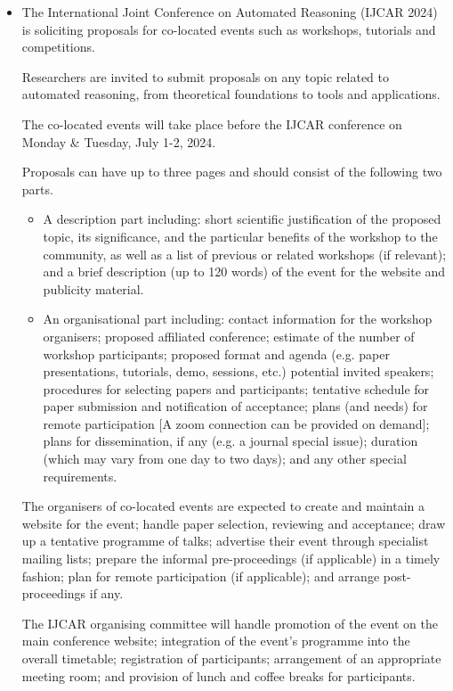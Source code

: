 \documentclass[prodmode,acmtecs]{acmsmall} %
\begin{document}
\begin{itemize}\item  The International Joint Conference on Automated Reasoning (IJCAR 2024) is soliciting proposals for co-located events such as workshops, tutorials and competitions. 
 
  Researchers are invited to submit proposals on any topic related to automated reasoning, from theoretical foundations to tools and applications. 
 
  The co-located events will take place before the IJCAR conference on Monday \& Tuesday, July 1-2, 2024. 
 
  Proposals can have up to three pages and should consist of the following two parts. 
 
\begin{itemize}\item  A description part including: short scientific justification of the proposed topic, its significance, and the particular benefits of the workshop to the community, as well as a list of previous or related workshops (if relevant); and a brief description (up to 120 words) of the event for the website and publicity material.
\item  An organisational part including: contact information for the workshop organisers; proposed affiliated conference; estimate of the number of workshop participants; proposed format and agenda (e.g. paper presentations, tutorials, demo, sessions, etc.) potential invited speakers; procedures for selecting papers and participants; tentative schedule for paper submission and notification of acceptance; plans (and needs) for remote participation [A zoom connection can be provided on demand]; plans for dissemination, if any (e.g. a journal special issue); duration (which may vary from one day to two days); and any other special requirements.
\end{itemize} 
  The organisers of co-located events are expected to create and maintain a website for the event; handle paper selection, reviewing and acceptance; draw up a tentative programme of talks; advertise their event through specialist mailing lists; prepare the informal pre-proceedings (if applicable) in a timely fashion; plan for remote participation (if applicable); and arrange post-proceedings if any. 
 
  The IJCAR organising committee will handle promotion of the event on the main conference website; integration of the event's programme into the overall timetable; registration of participants; arrangement of an appropriate meeting room; and provision of lunch and coffee breaks for participants. 
 

\end{itemize}
\end{document}
